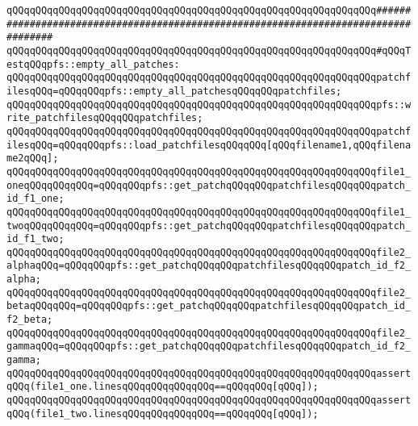 \verb|qQQqqQQqqQQqqQQqqQQqqQQqqQQqqQQqqQQqqQQqqQQqqQQqqQQqqQQqqQQqqQQq####################################################################################|\newline
\verb|qQQqqQQqqQQqqQQqqQQqqQQqqQQqqQQqqQQqqQQqqQQqqQQqqQQqqQQqqQQqqQQq#qQQqTestqQQqpfs::empty_all_patches:|\newline
\newline
\verb|qQQqqQQqqQQqqQQqqQQqqQQqqQQqqQQqqQQqqQQqqQQqqQQqqQQqqQQqqQQqqQQqpatchfilesqQQq=qQQqqQQqpfs::empty_all_patchesqQQqqQQqpatchfiles;|\newline
\newline
\verb|qQQqqQQqqQQqqQQqqQQqqQQqqQQqqQQqqQQqqQQqqQQqqQQqqQQqqQQqqQQqqQQqpfs::write_patchfilesqQQqqQQqpatchfiles;|\newline
\newline
\verb|qQQqqQQqqQQqqQQqqQQqqQQqqQQqqQQqqQQqqQQqqQQqqQQqqQQqqQQqqQQqqQQqpatchfilesqQQq=qQQqqQQqpfs::load_patchfilesqQQqqQQq[qQQqfilename1,qQQqfilename2qQQq];|\newline
\newline
\verb|qQQqqQQqqQQqqQQqqQQqqQQqqQQqqQQqqQQqqQQqqQQqqQQqqQQqqQQqqQQqqQQqfile1_oneqQQqqQQqqQQq=qQQqqQQqpfs::get_patchqQQqqQQqpatchfilesqQQqqQQqpatch_id_f1_one;|\newline
\verb|qQQqqQQqqQQqqQQqqQQqqQQqqQQqqQQqqQQqqQQqqQQqqQQqqQQqqQQqqQQqqQQqfile1_twoqQQqqQQqqQQq=qQQqqQQqpfs::get_patchqQQqqQQqpatchfilesqQQqqQQqpatch_id_f1_two;|\newline
\newline
\verb|qQQqqQQqqQQqqQQqqQQqqQQqqQQqqQQqqQQqqQQqqQQqqQQqqQQqqQQqqQQqqQQqfile2_alphaqQQq=qQQqqQQqpfs::get_patchqQQqqQQqpatchfilesqQQqqQQqpatch_id_f2_alpha;|\newline
\verb|qQQqqQQqqQQqqQQqqQQqqQQqqQQqqQQqqQQqqQQqqQQqqQQqqQQqqQQqqQQqqQQqfile2_betaqQQqqQQq=qQQqqQQqpfs::get_patchqQQqqQQqpatchfilesqQQqqQQqpatch_id_f2_beta;|\newline
\verb|qQQqqQQqqQQqqQQqqQQqqQQqqQQqqQQqqQQqqQQqqQQqqQQqqQQqqQQqqQQqqQQqfile2_gammaqQQq=qQQqqQQqpfs::get_patchqQQqqQQqpatchfilesqQQqqQQqpatch_id_f2_gamma;|\newline
\newline
\verb|qQQqqQQqqQQqqQQqqQQqqQQqqQQqqQQqqQQqqQQqqQQqqQQqqQQqqQQqqQQqqQQqassertqQQq(file1_one.linesqQQqqQQqqQQqqQQq==qQQqqQQq[qQQq]);|\newline
\verb|qQQqqQQqqQQqqQQqqQQqqQQqqQQqqQQqqQQqqQQqqQQqqQQqqQQqqQQqqQQqqQQqassertqQQq(file1_two.linesqQQqqQQqqQQqqQQq==qQQqqQQq[qQQq]);|\newline
\newline
